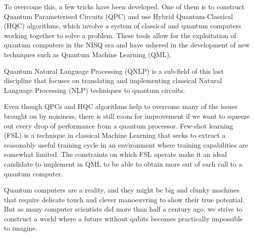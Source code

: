 To overcome this, a few tricks have been developed. One of them is to construct Quantum Parameterised Circuits (QPC) and use Hybrid Quantum-Classical (HQC) algorithms, which involve a system of classical and quantum computers working together to solve a problem. These tools allow for the exploitation of quantum computers in the NISQ era and have ushered in the development of new techniques such as Quantum Machine Learning (QML).

Quantum Natural Language Processing (QNLP) is a sub-field of this last discipline that focuses on translating and implementing classical Natural Language Processing (NLP) techniques to quantum circuits.

Even though QPCs and HQC algorithms help to overcome many of the issues brought on by noisiness, there is still room for improvement if we want to squeeze out every drop of performance from a quantum processor. Few-shot learning (FSL) is a technique in classical Machine Learning that seeks to extract a reasonably useful training cycle in an environment where training capabilities are somewhat limited. The constraints on which FSL operate make it an ideal candidate to implement in QML to be able to obtain more out of each call to a quantum computer.

Quantum computers are a reality, and they might be big and clunky machines that require delicate touch and clever manoeuvring to show their true potential. But as many computer scientists did more than half a century ago, we strive to construct a world where a future without qubits becomes practically impossible to imagine.
